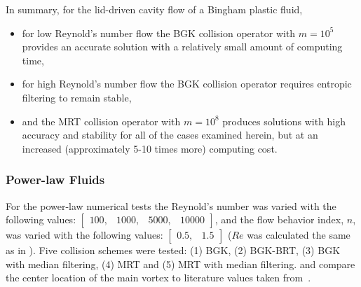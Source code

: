 In summary, for the lid-driven cavity flow of a Bingham plastic fluid, 
\begin{itemize}
    \item for low Reynold's number flow the BGK collision operator with $m = 10^5$ provides an accurate solution with a relatively small amount of computing time,
    \item for high Reynold's number flow the BGK collision operator requires entropic filtering to remain stable,
    \item and the MRT collision operator with $m = 10^8$ produces solutions with high accuracy and stability for all of the cases examined herein, but at an increased (approximately 5-10 times more) computing cost.
\end{itemize} 

\subsubsection{Power-law Fluids}

For the power-law numerical tests the Reynold's number was varied with the following values: $\begin{bmatrix}100,&1000,&5000,&10000\end{bmatrix}$, and the flow behavior index, $n$, was varied with the following values: $\begin{bmatrix}0.5,&1.5\end{bmatrix}$ ($Re$ was calculated the same as in ).
Five collision schemes were tested: (1) BGK, (2) BGK-BRT, (3) BGK with median filtering, (4) MRT and (5) MRT with median filtering.
 and  compare the center location of the main vortex to literature values taken from~\citet{li2014simulation}.

